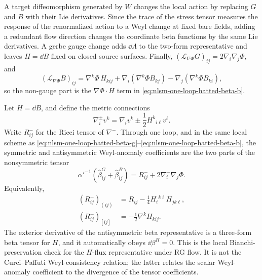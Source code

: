A target diffeomorphism generated by \(W\) changes the local action by
replacing \(G\) and \(B\) with their Lie derivatives.  Since the trace of the
stress tensor measures the response of the renormalized action to a Weyl
change at fixed bare fields, adding a redundant flow direction changes the
coordinate beta functions by the same Lie derivatives.  A gerbe gauge
change adds \(\dd\Lambda\) to the two-form representative and leaves
\(H=\dd B\) fixed on closed source surfaces.  Finally,
\((\mathcal L_{\nabla\Phi}G)_{ij}=2\nabla_i\nabla_j\Phi\), and
\[
  (\mathcal L_{\nabla\Phi}B)_{ij}
  =
  \nabla^k\Phi\,H_{kij}
  +
  \nabla_i(\nabla^k\Phi B_{kj})
  -
  \nabla_j(\nabla^k\Phi B_{ki}),
\]
so the non-gauge part is the \(\nabla\Phi\cdot H\) term in
\eqref{eq:nlsm-one-loop-hatted-beta-b}.

\begin{lemma}
\label{lem:nlsm-torsionful-one-loop-package}
Let \(H=\dd B\), and define the metric connections
\[
  \nabla_i^\pm v^k
  =
  \nabla_i v^k
  \pm \frac12 H^k{}_{i\ell}v^\ell .
\]
Write \(R^-_{ij}\) for the Ricci tensor of \(\nabla^-\).  Through one loop,
and in the same local scheme as
\eqref{eq:nlsm-one-loop-hatted-beta-g}--\eqref{eq:nlsm-one-loop-hatted-beta-b},
the symmetric and antisymmetric Weyl-anomaly coefficients are the two parts
of the nonsymmetric tensor
\begin{equation}
  \alpha'^{-1}
  \left(\widehat\beta^G_{ij}+\widehat\beta^B_{ij}\right)
  =
  R^-_{ij}+2\nabla_i^-\nabla_j\Phi .
  \label{eq:nlsm-torsionful-one-loop-package}
\end{equation}
Equivalently,
\begin{align}
  (R^-_{ij})_{(ij)}
  &=
  R_{ij}-\frac14H_i{}^{k\ell}H_{jk\ell},
  \label{eq:nlsm-torsionful-ricci-symmetric}\\
  (R^-_{ij})_{[ij]}
  &=
  -\frac12\nabla^kH_{kij}.
  \label{eq:nlsm-torsionful-ricci-antisymmetric}
\end{align}
The exterior derivative of the antisymmetric beta representative is a
three-form beta tensor for \(H\), and it automatically obeys
\(\dd\beta^H=0\).  This is the local Bianchi-preservation check for the
\(H\)-flux representative under RG flow.  It is not the Curci--Paffuti
Weyl-consistency relation; the latter relates the scalar Weyl-anomaly
coefficient to the divergence of the tensor coefficients.
\end{lemma}

